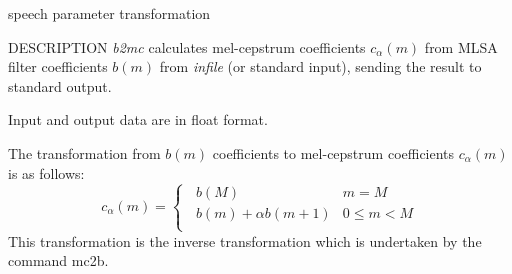 % 
% 
% 
% 
%                                                                        
%
%
{speech parameter transformation}

\begin{synopsis}
\item [b2mc] [ --m $M$ ] [ --a $A$ ] [ {\em infile} ]
\end{synopsis}

\begin{qsection}{DESCRIPTION}
{\em b2mc} calculates mel-cepstrum coefficients $c_\alpha(m)$ 
from MLSA filter coefficients $b(m)$ from {\em infile} (or standard input), 
sending the result to standard output.

Input and output data are in float format.

The transformation from $b(m)$ coefficients to mel-cepstrum coefficients
$c_\alpha(m)$ is as follows:
\begin{displaymath}
c_\alpha(m) = \begin{cases}
	  \;\; b(M) & m=M \\
	  \;\; b(m) + \alpha b(m+1) & 0 \leq m < M \\
	\end{cases}
\end{displaymath}
This transformation is the inverse transformation which is undertaken
by the command mc2b.

\end{qsection}

